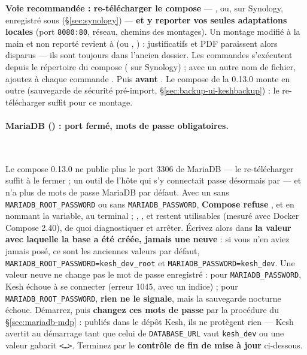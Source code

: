 \documentclass[a4paper,11pt,oneside]{article}
\begin{document}
\textbf{Voie recommandée : re-télécharger le compose} --- , ou, sur Synology,  enregistré sous  (\S\ref{sec:synology}) --- \textbf{et y reporter vos seules adaptations locales} (port \texttt{8080:80}, réseau, chemins des montages). Un montage modifié à la main et non reporté revient à  (ou , ) : justificatifs et PDF paraissent alors disparus --- ils sont toujours dans l'ancien dossier. Les commandes s'exécutent depuis le répertoire du compose ( sur Synology) ; avec un autre nom de fichier, ajoutez  à chaque commande . Puis  \textbf{avant} . Le compose de la 0.13.0 monte en outre  (sauvegarde de sécurité pré-import, \S\ref{sec:backup-ui-keshbackup}) : le re-télécharger suffit pour ce montage.

\paragraph{MariaDB () : port fermé, mots de passe obligatoires.}\mbox{}\\
\begin{sloppypar}
Le compose 0.13.0 ne publie plus le port 3306 de MariaDB --- le re-télécharger suffit à le fermer ; un outil de l'hôte qui s'y connectait passe désormais par  --- et n'a plus de mots de passe MariaDB par défaut. Avec un  sans \texttt{MARIADB\_ROOT\_PASSWORD} ou sans \texttt{MARIADB\_PASSWORD}, \textbf{Compose refuse} ,  et  en nommant la variable, au terminal ; , ,  et  restent utilisables (mesuré avec Docker Compose 2.40), de quoi diagnostiquer et arrêter. Écrivez alors dans  \textbf{la valeur avec laquelle la base a été créée, jamais une neuve} : si vous n'en aviez jamais posé, ce sont les anciennes valeurs par défaut, \texttt{MARIADB\_ROOT\_PASSWORD=kesh\_dev\_root} et \texttt{MARIADB\_PASSWORD=kesh\_dev}. Une valeur neuve ne change pas le mot de passe enregistré : pour \texttt{MARIADB\_PASSWORD}, Kesh échoue à se connecter (erreur 1045, avec un indice) ; pour \texttt{MARIADB\_ROOT\_PASSWORD}, \textbf{rien ne le signale}, mais la sauvegarde nocturne échoue. Démarrez, puis \textbf{changez ces mots de passe} par la procédure du \S\ref{sec:mariadb-mdp} : publiés dans le dépôt Kesh, ils ne protègent rien --- Kesh avertit au démarrage tant que celui de \texttt{DATABASE\_URL} vaut \texttt{kesh\_dev} ou une valeur gabarit \texttt{<…>}. Terminez par le \textbf{contrôle de fin de mise à jour} ci-dessous.
\end{sloppypar}
\end{document}
